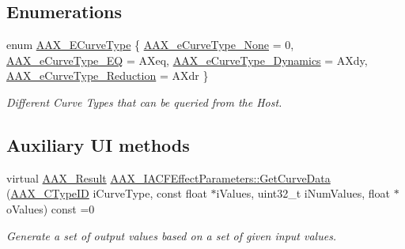  \subsection*{Enumerations}
\begin{DoxyCompactItemize}
\item 
enum \hyperlink{a00342_ga59c73d8f51c5c55d54a728eff39da884}{A\+A\+X\+\_\+\+E\+Curve\+Type} \{ \hyperlink{a00342_gga59c73d8f51c5c55d54a728eff39da884a115d7543992756d3474f944f31bcc784}{A\+A\+X\+\_\+e\+Curve\+Type\+\_\+\+None} = 0, 
\hyperlink{a00342_gga59c73d8f51c5c55d54a728eff39da884a01b32d7031ceff45f7acad05dcddad19}{A\+A\+X\+\_\+e\+Curve\+Type\+\_\+\+E\+Q} = \textquotesingle{}A\+Xeq\textquotesingle{}, 
\hyperlink{a00342_gga59c73d8f51c5c55d54a728eff39da884aed3949ae429e38e979f7d005759c579e}{A\+A\+X\+\_\+e\+Curve\+Type\+\_\+\+Dynamics} = \textquotesingle{}A\+Xdy\textquotesingle{}, 
\hyperlink{a00342_gga59c73d8f51c5c55d54a728eff39da884a011b1b00d6189a8903735dcae2f8bc93}{A\+A\+X\+\_\+e\+Curve\+Type\+\_\+\+Reduction} = \textquotesingle{}A\+Xdr\textquotesingle{}
 \}
\begin{DoxyCompactList}\small\item\em Different Curve Types that can be queried from the Host. \end{DoxyCompactList}\end{DoxyCompactItemize}
\subsection*{Auxiliary U\+I methods}
\begin{DoxyCompactItemize}
\item 
virtual \hyperlink{a00149_a4d8f69a697df7f70c3a8e9b8ee130d2f}{A\+A\+X\+\_\+\+Result} \hyperlink{a00342_gaa85bda4027342eb644a9c92a17da6d49}{A\+A\+X\+\_\+\+I\+A\+C\+F\+Effect\+Parameters\+::\+Get\+Curve\+Data} (\hyperlink{a00149_ac678f9c1fbcc26315d209f71a147a175}{A\+A\+X\+\_\+\+C\+Type\+I\+D} i\+Curve\+Type, const float $\ast$i\+Values, uint32\+\_\+t i\+Num\+Values, float $\ast$o\+Values) const =0
\begin{DoxyCompactList}\small\item\em Generate a set of output values based on a set of given input values. \end{DoxyCompactList}\end{DoxyCompactItemize}
